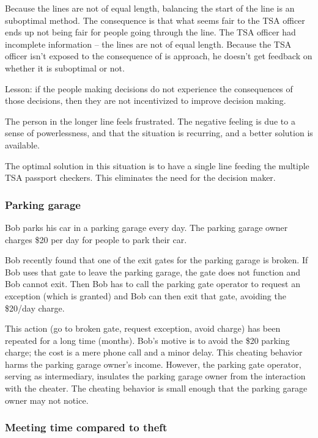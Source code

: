 Because the lines are not of equal length, balancing the start of the line is an suboptimal method. The consequence is that what seems fair to the TSA officer ends up not being fair for people going through the line. The TSA officer had incomplete information -- the lines are not of equal length. Because the TSA officer isn't exposed to the consequence of is approach, he doesn't get feedback on whether it is suboptimal or not.

Lesson: if the people making decisions do not experience the consequences of those decisions, then they are not incentivized to improve decision making.

The person in the longer line feels frustrated. The negative feeling is due to a sense of powerlessness, and that the situation is recurring, and a better solution is available.

The optimal solution in this situation is to have a single line feeding the multiple TSA passport checkers. This eliminates the need for the decision maker.


\subsubsection{Parking garage}
Bob parks his car in a parking garage every day. The parking garage owner charges \$20 per day for people to park their car.

Bob recently found that one of the exit gates for the parking garage is broken. If Bob uses that gate to leave the parking garage, the gate does not function and Bob cannot exit. Then Bob has to call the parking gate operator to request an exception (which is granted) and Bob can then exit that gate, avoiding the \$20/day charge.

This action (go to broken gate, request exception, avoid charge) has been repeated for a long time (months). Bob's motive is to avoid the \$20 parking charge; the cost is a mere phone call and a minor delay. This cheating behavior harms the parking garage owner's income. However, the parking gate operator, serving as intermediary, insulates the parking garage owner from the interaction with the cheater. The cheating behavior is small enough that the parking garage owner may not notice.


\subsubsection{Meeting time compared to theft}


